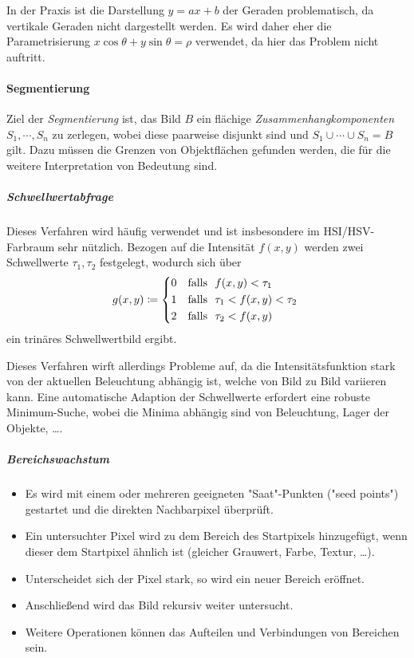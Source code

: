 						In der Praxis ist die Darstellung \( y = ax + b \) der Geraden problematisch, da vertikale Geraden nicht dargestellt werden. Es wird daher eher die Parametrisierung \( x \cos\theta + y \sin\theta = \rho \) verwendet, da hier das Problem nicht auftritt.
						

				\paragraph{Segmentierung}
					Ziel der \emph{Segmentierung} ist, das Bild \(B\) ein flächige \emph{Zusammenhangkomponenten} \( S_1, \cdots, S_n \) zu zerlegen, wobei diese paarweise disjunkt sind und \( S_1 \cup \cdots \cup S_n = B \) gilt. Dazu müssen die Grenzen von Objektflächen gefunden werden, die für die weitere Interpretation von Bedeutung sind.

					\subparagraph{Schwellwertabfrage}
						Dieses Verfahren wird häufig verwendet und ist insbesondere im HSI/HSV-Farbraum sehr nützlich. Bezogen auf die Intensität \( f(x, y) \) werden zwei Schwellwerte \( \tau_1, \tau_2 \) festgelegt, wodurch sich über
						\begin{equation*}
							g(x, y) \coloneqq
								\begin{cases*}
									0 & \text{falls } \( f(x, y) < \tau_1 \) \\
									1 & \text{falls } \( \tau_1 < f(x, y) < \tau_2 \) \\
									2 & \text{falls } \( \tau_2 < f(x, y) \)
								\end{cases*}
						\end{equation*}
						ein trinäres Schwellwertbild ergibt.
						
						Dieses Verfahren wirft allerdings Probleme auf, da die Intensitätsfunktion stark von der aktuellen Beleuchtung abhängig ist, welche von Bild zu Bild variieren kann. Eine automatische Adaption der Schwellwerte erfordert eine robuste Minimum-Suche, wobei die Minima abhängig sind von Beleuchtung, Lager der Objekte, \dots.

					\subparagraph{Bereichswachstum}
						\begin{itemize}
							\item Es wird mit einem oder mehreren geeigneten "Saat"-Punkten ("seed points") gestartet und die direkten Nachbarpixel überprüft.
							\item Ein untersuchter Pixel wird zu dem Bereich des Startpixels hinzugefügt, wenn dieser dem Startpixel ähnlich ist (\zB gleicher Grauwert, Farbe, Textur, \dots).
							\item Unterscheidet sich der Pixel stark, so wird ein neuer Bereich eröffnet.
							\item Anschließend wird das Bild rekursiv weiter untersucht.
							\item Weitere Operationen können \zB das Aufteilen und Verbindungen von Bereichen sein.
						\end{itemize}

